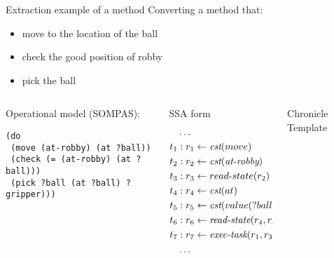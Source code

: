 \begin{frame}[c,fragile]{Extraction example of a method}
    \small
    Converting a method that:
    \small
\begin{itemize}
    \item move to the location of the ball
    \item check the good position of robby
    \item pick the ball
\end{itemize}
    \begin{columns}[c, T]
        \begin{column}{0.32\textwidth}
            Operational model (SOMPAS):
            \tiny
            \begin{lstlisting}
(do
 (move (at-robby) (at ?ball))
 (check (= (at-robby) (at ?ball)))
 (pick ?ball (at ?ball) ?gripper)))
         \end{lstlisting} 
        \end{column}


        \begin{column}{0.32\textwidth}
            SSA form
            \tiny
            \begin{align*}
                & \dots \\
        t_1 &: r_1 \leftarrow \textit{cst}(move) \\
        t_2 &: r_2 \leftarrow \textit{cst}(\textit{at-robby}) \\
        t_3 &: r_3 \leftarrow read\text{-}state(r_2) \\
        t_4 &: r_4 \leftarrow \textit{cst}(at) \\
        t_5 &: r_5 \leftarrow \textit{cst}(value(?ball)) \\
        t_6 &: r_6 \leftarrow \textit{read-state}(r_4, r_5) \\
        t_7 &: r_7 \leftarrow \textit{exec-task}(r_1, r_3, r_6) \\ 
            & \dots\\
            \end{align*}
        \end{column}
        \begin{column}{0.32\textwidth}
        Chronicle Template
        

\end{column}
\end{columns}
\end{frame}
